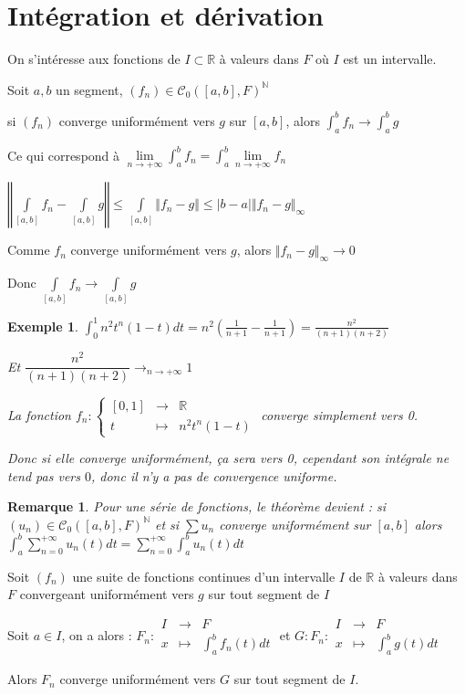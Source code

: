 \documentclass[a4paper,12pt]{book}
\newcommand{\Thr}[2]{\begin{tcolorbox}[sharp corners, colback=white,colframe=red!90!black!75, title=Théorème : #1]#2\end{tcolorbox}}
\newcommand{\Pre}[1]{\begin{tcolorbox}[sharp corners, colback=white,colframe=green!60!green!30!black!75, title=Preuve]#1\end{tcolorbox}}
\newtheorem{Exe}{Exemple}[section]
\newtheorem{Rem}{Remarque}[section]
\def\R{\mathbb{R}}
\def\N{\mathbb{N}}
\begin{document}
\section{Intégration et dérivation}
On s'intéresse aux fonctions de $I\subset\R$ à valeurs dans $F$ où $I$ est un intervalle.
\Thr{Intégration uniforme ou théorème d'échange limite-intégrale uniforme}{Soit ${a,b}$ un segment, $(f_n)\in\mathcal{C}_0([a,b],F)^\N$ \par si $(f_n)$ converge uniformément vers $g$ sur $[a,b]$, alors $\int_a^bf_n\to \int_a^bg$ \par Ce qui correspond à $\lim\limits_{n\to+\infty}\int_a^bf_n = \int_a^b\lim\limits_{n\to+\infty}f_n$}
\Pre{$\left\Vert\int\limits_{[a,b]}f_n-\int\limits_{[a,b]}g\right\Vert\leq \int\limits_{[a,b]}\Vert f_n-g\Vert\leq \vert b-a\vert\Vert f_n-g\Vert_\infty$ \par Comme $f_n$ converge uniformément vers $g$, alors $\Vert f_n-g\Vert_\infty\to 0$ \par Donc $\int\limits_{[a,b]}f_n\to\int\limits_{[a,b]}g$}
\begin{Exe}
$\int_0^1n^2t^n(1-t)dt = n^2(\frac{1}{n+1}-\frac{1}{n+1}) = \frac{n^2}{(n+1)(n+2)}$ \par Et $\dfrac{n^2}{(n+1)(n+2)}\to_{n\to +\infty} 1$ \par La fonction $f_n:\left\{\begin{array}{rcl} [0,1] & \to & \R \\ t & \mapsto & n^2t^n(1-t)\end{array}\right.$ converge simplement vers 0. \par Donc si elle converge uniformément, ça sera vers 0, cependant son intégrale ne tend pas vers $0$, donc il n'y a pas de convergence uniforme.
\end{Exe}
\begin{Rem}
Pour une série de fonctions, le théorème devient : si $(u_n)\in\mathcal{C}_0([a,b],F)^\N$ et si $\sum u_n$ converge uniformément sur $[a,b]$ alors $\int_a^b\sum\limits_{n=0}^{+\infty}u_n(t)dt = \sum\limits_{n=0}^{+\infty}\int_a^bu_n(t)dt$
\end{Rem}
\Thr{}{Soit $(f_n)$ une suite de fonctions continues d'un intervalle $I$ de $\R$ à valeurs dans $F$ convergeant uniformément vers $g$ sur tout segment de $I$ \par Soit $a\in I$, on a alors : $F_n:\begin{array}{rcl}I & \to & F \\ x & \mapsto & \int_a^bf_n(t)dt\end{array}$ et $G:F_n:\begin{array}{rcl}I & \to & F \\ x & \mapsto & \int_a^bg(t)dt\end{array}$ \par Alors $F_n$ converge uniformément vers $G$ sur tout segment de $I$.}
\end{document}
